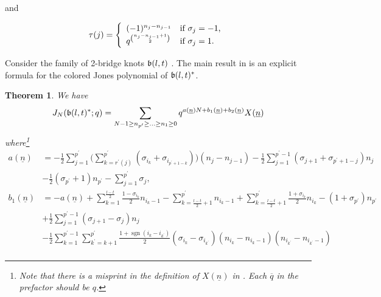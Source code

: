 \documentclass[11pt,reqno]{amsart}
\newtheorem{theorem}{Theorem}[section]
\theoremstyle{definition}
\numberwithin{equation}{section}
\newcommand{\sgn}{\operatorname{sgn}}
\begin{document}
\noindent and

\begin{equation} \label{tau}
\tau(j) = \left\{
\begin{array}{ll}
(-1)^{n_j - n_{j-1}} & \text{if $\sigma_j=-1$,} \\
q^{\binom{n_j - n_{j-1} + 1}{2}} & \text{if $\sigma_{j}=1$.} \\
\end{array} \right. \\
\end{equation}

Consider the family of 2-bridge knots $\frak{b}(l,t)$ \cite{bz}. The main result in \cite{takata} is an explicit formula for the colored Jones polynomial of $\frak{b}(l,t)^{*}$.

\begin{theorem} \label{takata} We have
\begin{equation} \label{spt}
J_N(\frak{b}(l,t)^{*}; q) = \sum_{N-1 \geq n_{p^{\prime}} \geq \dotsc \geq n_1 \geq 0} q^{a({\underline{n}})N + b_1(\underline{n}) + b_2(\underline{n})} X(\underline{n})
\end{equation}
where\footnote{Note that there is a misprint in the definition of $X(\underline{n})$ in \cite{takata}.   Each $\overline{q}$ in the prefactor should be $q$.}
\begin{equation*}
\begin{aligned}
a({\underline{n}}) & = -\frac{1}{2} \sum_{j=1}^{p^{\prime}} \Biggl( \sum_{k=r^{\prime}(j)}^{p^{\prime}} (\sigma_{i_k} + \sigma_{i_{p^{\prime} + 1 -k}})\Biggr) (n_j - n_{j-1}) - \frac{1}{2} \sum_{j=1}^{p^{\prime} - 1} (\sigma_{j+1} + \sigma_{p^{\prime} + 1 - j}) n_j \\
& - \frac{1}{2} (\sigma_{p^{\prime}} + 1) n_{p^{\prime}} - \sum_{j=1}^{p^{\prime}} \sigma_j, \\
b_1(\underline{n}) & = - a({\underline{n}}) + \sum_{k=1}^{\frac{l-t}{2}} \frac{1-\sigma_{i_k}}{2} n_{i_k - 1} - \sum_{k=\frac{l-t}{2}+1}^{p^{\prime}} n_{i_k - 1} + \sum_{k=\frac{l-t}{2}+1}^{p^{\prime}} \frac{1+\sigma_{i_k}}{2} n_{i_k} - (1+\sigma_{p^{\prime}}) n_{p^{\prime}} \\
& + \frac{1}{2} \sum_{j=1}^{p^{\prime} - 1} (\sigma_{j+1} - \sigma_j) n_j \\
& - \frac{1}{2} \sum_{k=1}^{p^{\prime} - 1} \sum_{k^{\prime} = k+1}^{p^{\prime}} \frac{1 + \sgn(i_k - i_{k^{\prime}})}{2}(\sigma_{i_k} - \sigma_{i_{k^{\prime}}})(n_{i_k} - n_{i_k - 1})(n_{i_{k^{\prime}}} - n_{i_{k^{\prime}} - 1}) \\

\end{aligned}
\end{equation*}
\end{theorem}
\end{document}
